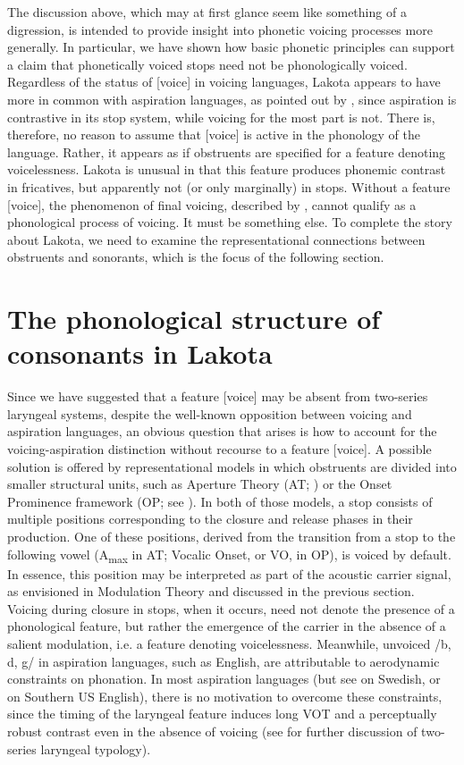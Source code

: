 \documentclass[output=paper]{langscibook}
\begin{document}
The discussion above, which may at first glance seem like something of a digression, is intended to provide insight into phonetic voicing processes more generally. In particular, we have shown how basic phonetic principles can support a claim that phonetically voiced stops need not be phonologically voiced. Regardless of the status of [voice] in voicing languages, Lakota appears to have more in common with aspiration languages, as pointed out by \citet{Rood2016}, since aspiration is contrastive in its stop system, while voicing for the most part is not. There is, therefore, no reason to assume that [voice] is active in the phonology of the language. Rather, it appears as if obstruents are specified for a feature denoting voicelessness. Lakota is unusual in that this feature produces phonemic contrast in fricatives, but apparently not (or only marginally) in stops. Without a feature [voice], the phenomenon of final voicing, described by \citet{BlevinsEtAl2020}, cannot qualify as a phonological process of voicing. It must be something else. To complete the story about Lakota, we need to examine the representational connections between obstruents and sonorants, which is the focus of the following section. 

\section{The phonological structure of consonants in Lakota}
\label{sec:schwartz:4}

Since we have suggested that a feature [voice] may be absent from two-series laryngeal systems, despite the well-known opposition between voicing and aspiration languages, an obvious question that arises is how to account for the voicing-aspiration distinction without recourse to a feature [voice]. A possible solution is offered by representational models in which obstruents are divided into smaller structural units, such as Aperture Theory (AT; \citealt{Steriade1993}) or the Onset Prominence framework (OP; see \citealt{Schwartz2016,Schwartz2017}). In both of those models, a stop consists of multiple positions corresponding to the closure and release phases in their production. One of these positions, derived from the transition from a stop to the following vowel (A\textsubscript{max} in AT; Vocalic Onset, or VO, in OP), is voiced by default. In essence, this position may be interpreted as part of the acoustic carrier signal, as envisioned in Modulation Theory and discussed in the previous section. Voicing during closure in stops, when it occurs, need not denote the presence of a phonological feature, but rather the emergence of the carrier in the absence of a salient modulation, i.e. a feature denoting voicelessness. Meanwhile, unvoiced /b, d, g/ in aspiration languages, such as English, are attributable to aerodynamic constraints on phonation. In most aspiration languages (but see \citealt{HelgasonRingen2008} on Swedish, or \citealt{JacewiczEtAl2009} on Southern US English), there is no motivation to overcome these constraints, since the timing of the laryngeal feature induces long VOT and a perceptually robust contrast even in the absence of voicing (see \citealt{Schwartz2017,Schwartz2022} for further discussion of two-series laryngeal typology).
\end{document}
